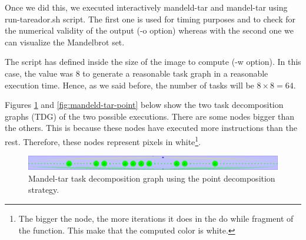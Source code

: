 \documentclass[12pt, a4paper]{article}
\begin{document}
Once we did this, we executed interactively mandeld-tar and mandel-tar using run-tareador.sh script. The first one is used for timing purposes and to check for the numerical validity of the output (-o option) whereas with the second one we can visualize the Mandelbrot set.

The script has defined inside the size of the image to compute (-w option). In this case, the value was 8 to generate a reasonable task graph in a reasonable execution time. Hence, as we said before, the number of tasks will be $8 \times 8 = 64$.

Figures \ref{fig:mandel-tar-point} and \ref{fig:mandeld-tar-point} below show the two task decomposition graphs (TDG) of the two possible executions. There are some nodes bigger than the others. This is because these nodes have executed more instructions than the rest. Therefore, these nodes represent pixels in white\footnote{The bigger the node, the more iterations it does in the do while fragment of the function. This make that the computed color is white.}.

\begin{figure}[H]
	\centering
	\includegraphics[scale=0.106]{./mandel-tar_point}
	\caption{Mandel-tar task decomposition graph using the point decomposition strategy.}
	\label{fig:mandel-tar-point}
\end{figure}
\end{document}
